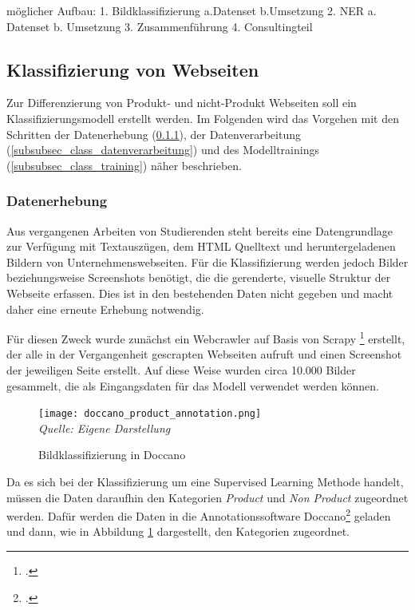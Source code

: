 möglicher Aufbau:
1.	Bildklassifizierung
	a.Datenset
	b.Umsetzung
2.	NER
	a.	Datenset
	b.	Umsetzung
3.	Zusammenführung
4.	Consultingteil

\subsection{Klassifizierung von Webseiten} \label{subsec_klassifierung_websites}
Zur Differenzierung von Produkt- und nicht-Produkt Webseiten soll ein Klassifizierungsmodell erstellt werden.
Im Folgenden wird das Vorgehen mit den Schritten der Datenerhebung (\ref{subsubsec_class_datenerhebung}), der Datenverarbeitung (\ref{subsubsec_class_datenverarbeitung}) und des Modelltrainings (\ref{subsubsec_class_training}) näher beschrieben.
\subsubsection{Datenerhebung} \label{subsubsec_class_datenerhebung}
Aus vergangenen Arbeiten von Studierenden steht bereits eine Datengrundlage zur Verfügung mit Textauszügen, dem HTML Quelltext und heruntergeladenen Bildern von Unternehmenswebseiten.
Für die Klassifizierung werden jedoch Bilder beziehungsweise Screenshots benötigt, die die gerenderte, visuelle Struktur der Webseite erfassen.
Dies ist in den bestehenden Daten nicht gegeben und macht daher eine erneute Erhebung notwendig.

Für diesen Zweck wurde zunächst ein Webcrawler auf Basis von Scrapy \footcite[\vglf][]{zotero-328} erstellt, der alle in der Vergangenheit gescrapten Webseiten aufruft und einen Screenshot der jeweiligen Seite erstellt.
Auf diese Weise wurden circa 10.000 Bilder gesammelt, die als Eingangsdaten für das Modell verwendet werden können.

\begin{figure}[H]
    \centering
    \caption[]{Bildklassifizierung in Doccano}
	\label{fig:doccano_products}
    \texttt{[image: doccano\_product\_annotation.png]}
	\\
	\textit{Quelle: Eigene Darstellung}
\end{figure}
Da es sich bei der Klassifizierung um eine Supervised Learning Methode handelt, müssen die Daten daraufhin den Kategorien \textit{Product} und \textit{Non Product} zugeordnet werden.
Dafür werden die Daten in die Annotationssoftware Doccano\footcite[\vglf][]{doccano-2018} geladen und dann, wie in Abbildung \ref{fig:doccano_products} dargestellt, den Kategorien zugeordnet.

